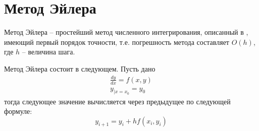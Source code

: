 \section{Метод Эйлера}
Метод Эйлера -- простейший метод численного интегрирования, описанный в
\cite[раздел 2, глава 7]{1956}, имеющий первый
порядок точности, т.е. погрешность метода составляет $O(h)$, где $h$ --
величина шага.

Метод Эйлера состоит в следующем. Пусть дано
\begin{equation}\label{eq:koshi}
    \begin{gathered}
        \frac{dy}{dx} = f(x,y) \\
        y_{|x=x_0} = y_0
    \end{gathered}
\end{equation}
тогда следующее значение вычисляется через предыдущее по следующей формуле:
\begin{equation}
    y_{i+1} = y_i + hf(x_i, y_i)
\end{equation}
